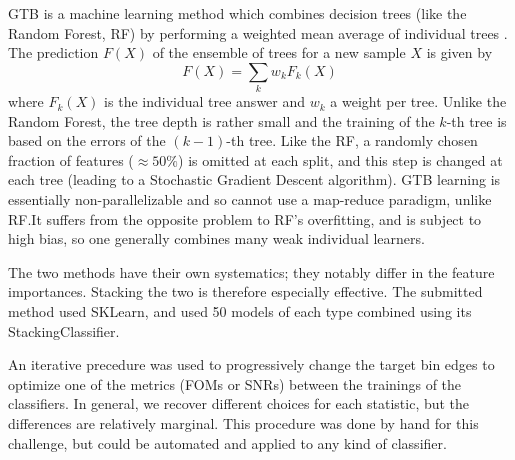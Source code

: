 \documentclass[twocolumn,twocolappendix]{aastex63}
\begin{document}
GTB is a machine learning method which combines decision trees (like the Random Forest, RF)
by performing a weighted mean average of individual trees \citep{Friedman:2002we,RefWorks:1634}. 
The prediction $F(X)$ of the ensemble of trees for a new sample $X$ is given by
\begin{equation}
F(X) = \sum_k w_k F_k(X)
\end{equation}
where $F_k(X)$ is the individual tree answer and $w_k$ a weight per tree. Unlike the Random Forest, the 
tree depth is rather small and the training  of the $k$-th tree is based on the errors of the
$(k-1)$-th tree.  Like the RF, a randomly chosen fraction of features ($\approx 50\%$) is 
omitted at each split, and this step is changed at each tree (leading to a Stochastic Gradient Descent 
algorithm).  GTB learning is essentially non-parallelizable and so cannot use a map-reduce paradigm, 
unlike RF.It suffers from the opposite problem to RF's overfitting, and is subject
to high bias, so one generally combines many weak individual learners.

The two methods have their own systematics; they notably differ in the feature importances. Stacking 
the two is therefore especially effective.  The submitted method used {\sc SKLearn}, and used 50 models 
of each type combined using its {\sc StackingClassifier}.

An iterative precedure was used to progressively change the target bin edges to optimize one of the metrics (FOMs or SNRs) between the trainings of the classifiers. In general, we recover different choices for each statistic, but the differences are relatively marginal. This procedure was done by hand for this challenge, but could be automated and applied to any kind of classifier.


 
        
\end{document}
